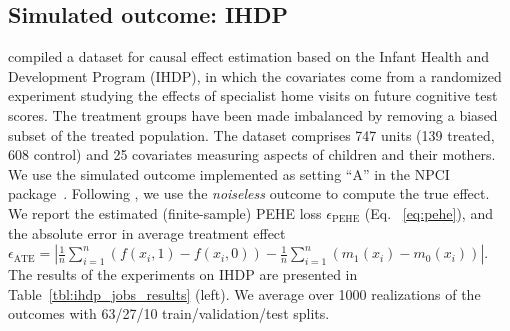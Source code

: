 \documentclass{article}
\def \epehe{\epsilon_{\text{PEHE}}}
\def \eate{\epsilon_{\text{ATE}}}
\begin{document}
\subsection{Simulated outcome: IHDP}\vskip -5pt
\citet{hill2011bayesian} compiled a dataset for causal effect estimation based on the Infant Health and Development Program (IHDP), in which the covariates come from a randomized experiment studying the effects of specialist home visits on future cognitive test scores. The treatment groups have been made imbalanced by removing a biased subset of the treated population. The dataset comprises 747 units (139 treated, 608 control) and 25 covariates measuring aspects of children and their mothers. We use the simulated outcome implemented as setting ``A'' in the NPCI package~\citep{npci}. Following \citet{hill2011bayesian}, we use the \emph{noiseless} outcome to compute the true effect. We report the estimated (finite-sample) PEHE loss $\epehe$ (Eq. ~\ref{eq:pehe}), and the absolute error in average treatment effect $\eate = |\frac{1}{n}\sum_{i=1}^n (f(x_i, 1) - f(x_i, 0)) - \frac{1}{n}\sum_{i=1}^n (m_1(x_i) - m_0(x_i))|$.
The results of the experiments on IHDP are presented in Table~\ref{tbl:ihdp_jobs_results} (left). We average over 1000 realizations of the outcomes with 63/27/10 train/validation/test splits.
\end{document}
